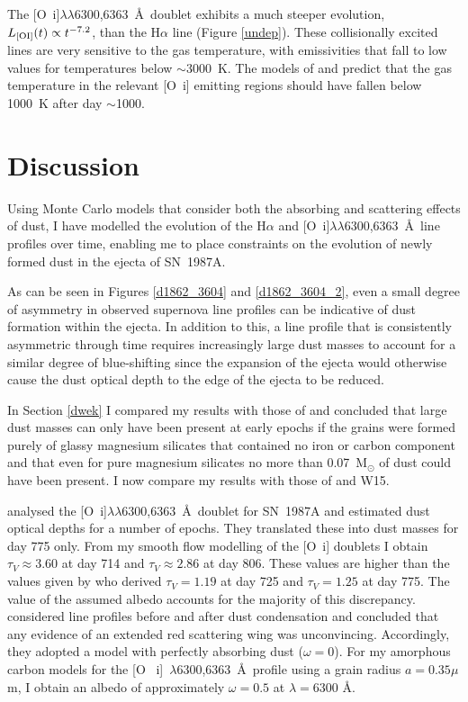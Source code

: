 The [O~{\sc i}]$\lambda\lambda$6300,6363~\AA\ doublet exhibits a much 
steeper evolution, $L_{\rm [OI]}(t) \propto t^{-7.2}$, than the H$\alpha$ line 
(Figure \ref{undep}). These collisionally excited lines are very sensitive 
to the gas temperature, with emissivities that fall to low values for 
temperatures below $\sim$3000~K. The models of \citet{Li1992} and \citet{Kozma1998a} predict that the gas temperature in the relevant [O~{\sc i}] emitting 
regions should have fallen below 1000~K after day $\sim$1000.





\section{Discussion}
\label{discuss}

Using Monte Carlo models that consider both the absorbing and scattering 
effects of dust, I have modelled the evolution of the H$\alpha$ and 
[O~{\sc i}]$\lambda\lambda$6300,6363~\AA\ line profiles over time, enabling me 
to place constraints on the evolution of newly formed dust in the ejecta 
of SN~1987A.

As can be seen in Figures \ref{d1862_3604} and \ref{d1862_3604_2}, even a small degree of 
asymmetry in observed supernova line profiles can be indicative of dust 
formation within the ejecta.  In addition to this, a line profile that is 
consistently asymmetric through time requires increasingly large dust 
masses to account for a similar degree of blue-shifting since the 
expansion of the ejecta would otherwise cause the dust optical depth to 
the edge of the ejecta to be reduced.

In Section \ref{dwek} I compared my results with those of \citet{Dwek2015} and 
concluded that large dust masses can only have been present at early 
epochs if the grains were formed purely of glassy magnesium silicates that 
contained no iron or carbon component and that even for pure magnesium 
silicates no more than 0.07~M$_\odot$ of dust could have been present. I now 
compare my results with those of \citet{Lucy1989} and W15.

\citet{Lucy1989} analysed the [O~{\sc i}]$\lambda\lambda$6300,6363~\AA\ doublet 
for SN~1987A and estimated dust optical depths for a number of epochs. 
They translated these into dust masses for day 775 only. From my smooth 
flow modelling of the [O~{\sc i}] doublets I obtain $\tau_V \approx 3.60$ at day 
714 and $\tau_V \approx 2.86$ at day 806.  These values are higher 
than the values given by \citet{Lucy1989} who derived $\tau_V=1.19$ at day 
725 and $\tau_V=1.25$ at day 775.  The value of the assumed albedo 
accounts for the majority of this discrepancy.  \citet{Lucy1989} 
considered line profiles before and after dust condensation and concluded 
that any evidence of an extended red scattering wing was unconvincing.  
Accordingly, they adopted a model with perfectly absorbing dust ($\omega = 
0$).  For my amorphous carbon models for the [O~{\sc 
i}]~$\lambda$6300,6363~\AA\ profile using a grain radius $a=0.35\mu$m, I 
obtain an albedo of approximately $\omega = 0.5$ at $\lambda=6300$ \AA.

